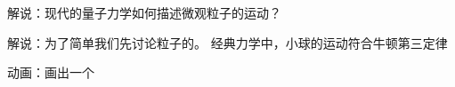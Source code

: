 
\begin{issues}
\issueDraft
\end{issues}


解说：现代的量子力学如何描述微观粒子的运动？ 


解说：为了简单我们先讨论粒子的。 经典力学中，小球的运动符合牛顿第三定律

动画：画出一个

